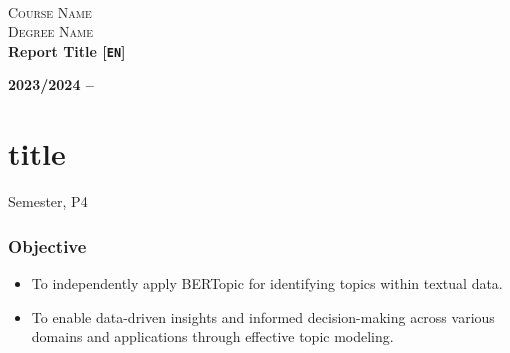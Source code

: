 \documentclass[12pt]{article}
\newcommand{\HRule}{\rule{\linewidth}{ 0.5mm}} %
\begin{document}
\begin{center}
    \mbox{}\\[2.0cm]
    \textsc{\Huge Course Name}\\[2.5cm]
    \textsc{\LARGE Degree Name}\\[2.0cm]
    {\large \bf {Report  Title} [\texttt{EN}]}\\[0.2cm]
\end{center}   
\begin{center}
    \large \bf 2023/2024 -- \part{title} Semester, P4
\end{center}

\thispagestyle{empty}

\setcounter{page}{0}

\newpage

\tableofcontents 

\newpage

\section{Objective}
\par
\begin{itemize}
    \item To independently apply BERTopic for identifying  topics  within textual data.
    \item To enable data-driven insights and informed decision-making across various domains and applications through effective topic modeling.
\end{itemize}
\end{document}
